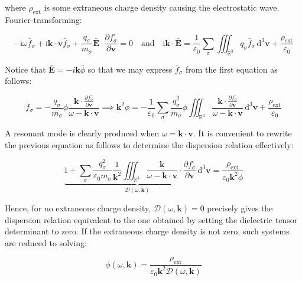 where $\rho_\text{ext}$ is some extraneous charge density causing the electrostatic wave. Fourier-transforming:

\begin{equation}
    -\mathrm{i}\omega\bar{f}_\sigma+\mathrm{i}\mathbf{k}\cdot\mathbf{v}\bar{f}_\sigma+\frac{q_\sigma}{m_\sigma}\bar{\mathbf{E}}\cdot\frac{\partial f_\sigma^\square}{\partial\mathbf{v}}=0\quad\text{and}\quad \mathrm{i}\mathbf{k}\cdot\bar{\mathbf{E}}=\frac{1}{\varepsilon_0}\sum_\sigma\iiint_{\mathbb{R}^3}q_\sigma\bar{f}_\sigma\,\mathrm{d}^3\mathbf{v}+\frac{\rho_\text{ext}}{\varepsilon_0}
\end{equation}

Notice that $\bar{\mathbf{E}}=-i\mathbf{k}\bar{\phi}$ so that we may express $\bar{f}_\sigma$ from the first equation as follows:

\begin{equation}
    \bar{f}_\sigma=-\frac{q_\sigma}{m_\sigma}\phi\frac{\mathbf{k}\cdot\frac{\partial f_\sigma^\square}{\partial\mathbf{v}}}{\omega-\mathbf{k}\cdot\mathbf{v}}\implies\mathbf{k}^2\phi=-\frac{1}{\varepsilon_0}\sum_\sigma\frac{q_\sigma^2}{m_\sigma}\phi\iiint_{\mathbb{R}^3}\frac{\mathbf{k}\cdot\frac{\partial f_\sigma^\square}{\partial\mathbf{v}}}{\omega-\mathbf{k}\cdot\mathbf{v}}\,\mathrm{d}^3\mathbf{v}+\frac{\rho_\text{ext}}{\varepsilon_0}
\end{equation}

A resonant mode is clearly produced when $\omega=\mathbf{k}\cdot\mathbf{v}$. It is convenient to rewrite the previous equation as follows to determine the dispersion relation effectively:

\begin{equation}
    \underbrace{1+\sum_\sigma\frac{q_\sigma^2}{\varepsilon_0m_\sigma}\frac{1}{\mathbf{k}^2}\iiint_{\mathbb{R}^3}\frac{\mathbf{k}}{\omega-\mathbf{k}\cdot\mathbf{v}}\cdot\frac{\partial f_\sigma^\square}{\partial\mathbf{v}}\,\mathrm{d}^3\mathbf{v}}_{\mathcal{D}(\omega,\mathbf{k})}=\frac{\rho_\text{ext}}{\varepsilon_0\mathbf{k}^2\phi}
\end{equation}

Hence, for no extraneous charge density, $\mathcal{D}(\omega,\mathbf{k})=0$ precisely gives the dispersion relation equivalent to the one obtained by setting the dielectric tensor determinant to zero. If the extraneous charge density is not zero, such systems are reduced to solving:

\begin{equation}
    \phi(\omega,\mathbf{k})=\frac{\rho_\text{ext}}{\varepsilon_0\mathbf{k}^2\mathcal{D}(\omega,\mathbf{k})}
\end{equation}

